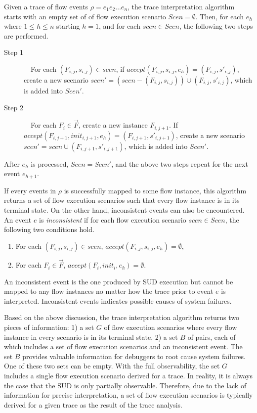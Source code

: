 \documentclass[12pt,frontmatter,copyright,thesis]{usfmanus}
\begin{document}
 Given a trace of flow events $\rho = e_1e_2\ldots e_n$, the
 trace interpretation algorithm starts with an empty set of
 of flow execution scenario $\mathit{Scen} = \emptyset$.
 Then, for each $e_h$ where $1 \leq h \leq n$ starting $h=1$,
 and for each $\mathit{scen} \in \mathit{Scen}$, the
 following two steps are performed.
 \begin{description}
 \item[Step 1]~~For each $(F_{i,j}, s_{i,j}) \in
   \mathit{scen}$, if $\mathit{accept}(F_{i,j}, s_{i,j}, e_h)
   = (F_{i,j}, s'_{i,j})$, create a new scenario
   $\mathit{scen}' = (\mathit{scen} - (F_{i,j}, s_{i,j}))
   \cup (F_{i,j}, s'_{i,j})$, which is added into
   $\mathit{Scen}'$.

 \item[Step 2]~~For each $F_i \in \vec{F}$, create a new
   instance $F_{i, j+1}$.  If $\mathit{accept}(F_{i,j+1},
   \mathit{init}_{i,j+1}, e_h) = (F_{i,j+1}, s'_{i,j+1})$,
   create a new scenario $\mathit{scen}' = \mathit{scen} \cup
   (F_{i,j+1}, s'_{i,j+1})$, which is added into
   $\mathit{Scen}'$.
 \end{description}

 After $e_h$ is processed, $Scen = Scen'$, and the above two
 steps repeat for the next event $e_{h+1}$.

 If every events in $\rho$ is successfully mapped to some
 flow instance, this algorithm returns a set of flow
 execution scenarios such that every flow instance is in its
 terminal state.  On the other hand, inconsistent events can
 also be encountered.  An event $e$ is \emph{inconsistent} if
 for each flow execution scenario $\mathit{scen} \in
 \mathit{Scen}$, the following two conditions hold.

 \begin{enumerate}
 \item For each $(F_{i,j}, s_{i,j}) \in \mathit{scen}$,
   $\mathit{accept}(F_{i,j}, s_{i,j}, e_h) = \emptyset$,
 \item For each $F_i \in \vec{F}$, $\mathit{accept}(F_{i},
   \mathit{init}_{i}, e_h) = \emptyset$.
 \end{enumerate}

 An inconsistent event is the one produced by SUD execution
 but cannot be mapped to any flow instances no matter how the
 trace prior to event $e$ is interpreted.  Inconsistent
 events indicates possible causes of system failures.

 Based on the above discussion, the trace interpretation
 algorithm returns two pieces of information: 1) a set $G$ of
 flow execution scenarios where every flow instance in every
 scenario is in its terminal state, 2) a set $B$ of pairs,
 each of which includes a set of flow execution scenarios and
 an inconsistent event.  The set $B$ provides valuable
 information for debuggers to root cause system failures.
 One of these two sets can be empty.  With the full
 observability, the set $G$ includes a single flow execution
 scenario derived for a trace.  In reality, it is always the
 case that the SUD is only partially observable.  Therefore,
 due to the lack of information for precise interpretation, a
 set of flow execution scenarios is typically derived for a
 given trace as the result of the trace analysis.
\end{document}
